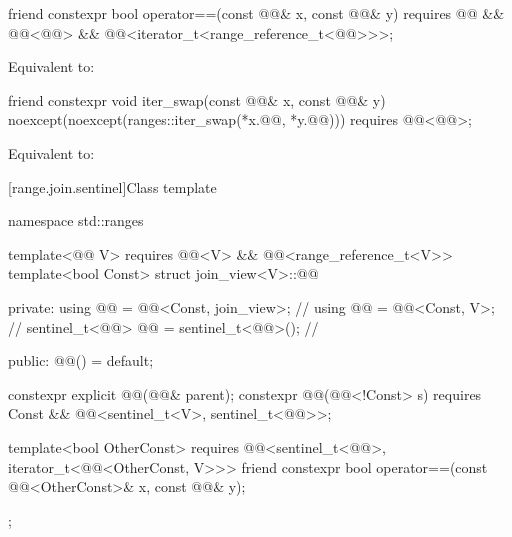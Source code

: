 %
\begin{itemdecl}
friend constexpr bool operator==(const @@& x, const @@& y)
  requires @@ && @@<@@> &&
           @@<iterator_t<range_reference_t<@@>>>;
\end{itemdecl}

\begin{itemdescr}
\pnum
\effects
Equivalent to:
\end{itemdescr}

%
\begin{itemdecl}
friend constexpr void iter_swap(const @@& x, const @@& y)
  noexcept(noexcept(ranges::iter_swap(*x.@@, *y.@@)))
  requires @@<@@>;
\end{itemdecl}

\begin{itemdescr}
\pnum
\effects
Equivalent to: 
\end{itemdescr}

[range.join.sentinel]{Class template }

\begin{codeblock}
namespace std::ranges {
  template<@@ V>
    requires @@<V> && @@<range_reference_t<V>>
  template<bool Const>
  struct join_view<V>::@@ {
  private:
    using @@ = @@<Const, join_view>;       // \expos
    using @@ = @@<Const, V>;                 // \expos
    sentinel_t<@@> @@ = sentinel_t<@@>();         // \expos

  public:
    @@() = default;

    constexpr explicit @@(@@& parent);
    constexpr @@(@@<!Const> s)
      requires Const && @@<sentinel_t<V>, sentinel_t<@@>>;

    template<bool OtherConst>
      requires @@<sentinel_t<@@>, iterator_t<@@<OtherConst, V>>>
    friend constexpr bool operator==(const @@<OtherConst>& x, const @@& y);
  };
}
\end{codeblock}


